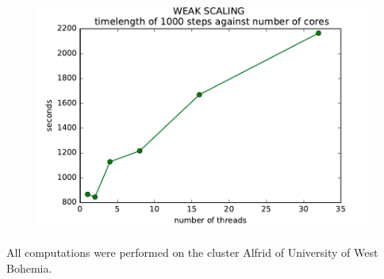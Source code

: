 \begin{figure}[H]
 \centering 
 \includegraphics[width=1\textwidth]{./img/weakscaling}
\end{figure}

All computations were performed on the cluster Alfrid of University of West Bohemia.

